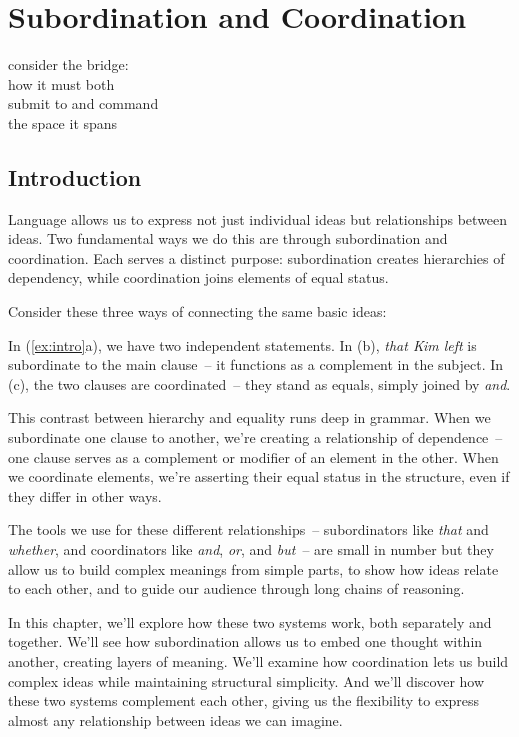 \chapter{Subordination and Coordination} \label{ch:subord-coord}

\epigraph{consider the bridge:\\
how it must both\\
submit to and command\\
the space it spans}{}

\section{Introduction}

Language allows us to express not just individual ideas but relationships between ideas. Two fundamental ways we do this are through subordination and coordination. Each serves a distinct purpose: subordination creates hierarchies of dependency, while coordination joins elements of equal status.

Consider these three ways of connecting the same basic ideas:

\ea \label{ex:intro}
    \z
\z

In (\ref{ex:intro}a), we have two independent statements. In (b), \textit{that Kim left} is subordinate to the main clause~-- it functions as a complement in the subject. In (c), the two clauses are coordinated~-- they stand as equals, simply joined by \textit{and}.

This contrast between hierarchy and equality runs deep in grammar. When we subordinate one clause to another, we're creating a relationship of dependence~-- one clause serves as a complement or modifier of an element in the other. When we coordinate elements, we're asserting their equal status in the structure, even if they differ in other ways.

The tools we use for these different relationships~-- subordinators like \textit{that} and \textit{whether}, and coordinators like \textit{and}, \textit{or}, and \textit{but}~-- are small in number but they allow us to build complex meanings from simple parts, to show how ideas relate to each other, and to guide our audience through long chains of reasoning.

In this chapter, we'll explore how these two systems work, both separately and together. We'll see how subordination allows us to embed one thought within another, creating layers of meaning. We'll examine how coordination lets us build complex ideas while maintaining structural simplicity. And we'll discover how these two systems complement each other, giving us the flexibility to express almost any relationship between ideas we can imagine.

